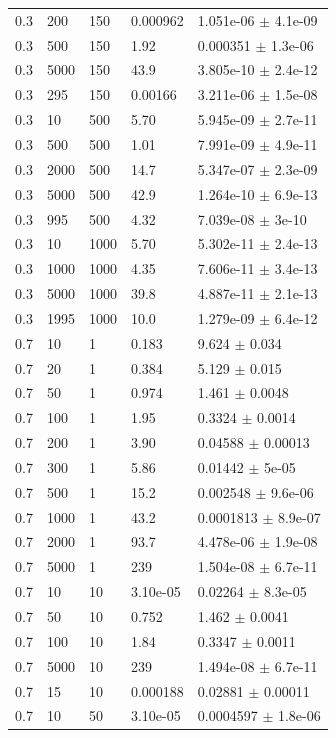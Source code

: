 \begin{longtable}{lllll}
	0.3 & 200 & 150 & 0.000962 & 1.051e-06 $\pm$ 4.1e-09 \\
	0.3 & 500 & 150 & 1.92 & 0.000351 $\pm$ 1.3e-06 \\
	0.3 & 5000 & 150 & 43.9 & 3.805e-10 $\pm$ 2.4e-12 \\
	0.3 & 295 & 150 & 0.00166 & 3.211e-06 $\pm$ 1.5e-08 \\
	0.3 & 10 & 500 & 5.70 & 5.945e-09 $\pm$ 2.7e-11 \\
	0.3 & 500 & 500 & 1.01 & 7.991e-09 $\pm$ 4.9e-11 \\
	0.3 & 2000 & 500 & 14.7 & 5.347e-07 $\pm$ 2.3e-09 \\
	0.3 & 5000 & 500 & 42.9 & 1.264e-10 $\pm$ 6.9e-13 \\
	0.3 & 995 & 500 & 4.32 & 7.039e-08 $\pm$ 3e-10 \\
	0.3 & 10 & 1000 & 5.70 & 5.302e-11 $\pm$ 2.4e-13 \\
	0.3 & 1000 & 1000 & 4.35 & 7.606e-11 $\pm$ 3.4e-13 \\
	0.3 & 5000 & 1000 & 39.8 & 4.887e-11 $\pm$ 2.1e-13 \\
	0.3 & 1995 & 1000 & 10.0 & 1.279e-09 $\pm$ 6.4e-12 \\
	0.7 & 10 & 1 & 0.183 & 9.624 $\pm$ 0.034 \\
	0.7 & 20 & 1 & 0.384 & 5.129 $\pm$ 0.015 \\
	0.7 & 50 & 1 & 0.974 & 1.461 $\pm$ 0.0048 \\
	0.7 & 100 & 1 & 1.95 & 0.3324 $\pm$ 0.0014 \\
	0.7 & 200 & 1 & 3.90 & 0.04588 $\pm$ 0.00013 \\
	0.7 & 300 & 1 & 5.86 & 0.01442 $\pm$ 5e-05 \\
	0.7 & 500 & 1 & 15.2 & 0.002548 $\pm$ 9.6e-06 \\
	0.7 & 1000 & 1 & 43.2 & 0.0001813 $\pm$ 8.9e-07 \\
	0.7 & 2000 & 1 & 93.7 & 4.478e-06 $\pm$ 1.9e-08 \\
	0.7 & 5000 & 1 & 239 & 1.504e-08 $\pm$ 6.7e-11 \\
	0.7 & 10 & 10 & 3.10e-05 & 0.02264 $\pm$ 8.3e-05 \\
	0.7 & 50 & 10 & 0.752 & 1.462 $\pm$ 0.0041 \\
	0.7 & 100 & 10 & 1.84 & 0.3347 $\pm$ 0.0011 \\
	0.7 & 5000 & 10 & 239 & 1.494e-08 $\pm$ 6.7e-11 \\
	0.7 & 15 & 10 & 0.000188 & 0.02881 $\pm$ 0.00011 \\
	0.7 & 10 & 50 & 3.10e-05 & 0.0004597 $\pm$ 1.8e-06 \\

\end{longtable}
